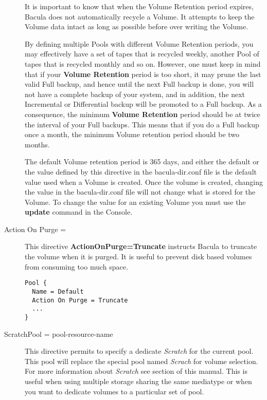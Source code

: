 \begin{description}
   It is important to know that when the Volume Retention period expires, 
   Bacula does not automatically recycle a Volume. It attempts to keep the
   Volume data intact as long as possible before over writing the Volume.
   
   By defining multiple Pools with different Volume Retention periods, you
   may effectively have a set of tapes that is recycled weekly, another
   Pool of tapes that is recycled monthly and so on.  However, one must
   keep in mind that if your {\bf Volume Retention} period is too short, it
   may prune the last valid Full backup, and hence until the next Full
   backup is done, you will not have a complete backup of your system, and
   in addition, the next Incremental or Differential backup will be
   promoted to a Full backup.  As a consequence, the minimum {\bf Volume
   Retention} period should be at twice the interval of your Full backups.
   This means that if you do a Full backup once a month, the minimum Volume
   retention period should be two months.
   
   The default Volume retention period is 365 days, and either the default
   or the value defined by this directive in the bacula-dir.conf file is
   the default value used when a Volume is created.  Once the volume is
   created, changing the value in the bacula-dir.conf file will not change
   what is stored for the Volume.  To change the value for an existing
   Volume you must use the {\bf update} command in the Console.

\item [Action On Purge = \lt{Truncate}]

This directive \textbf{ActionOnPurge=Truncate} instructs Bacula to truncate
the volume when it is purged. It is useful to prevent disk based volumes from
consuming too much space. 

\begin{verbatim}
Pool {
  Name = Default
  Action On Purge = Truncate
  ...
}
\end{verbatim}

\label{PoolScratchPool}
\item [ScratchPool = \lt{}pool-resource-name\gt{}]
   This directive permits to specify a dedicate \textsl{Scratch} for the
   current pool. This pool will replace the special pool named \textsl{Scrach}
   for volume selection. For more information about \textsl{Scratch} see
    section of this manual. This is useful
   when using multiple storage sharing the same mediatype or when you want to
   dedicate volumes to a particular set of pool.


\end{description}
